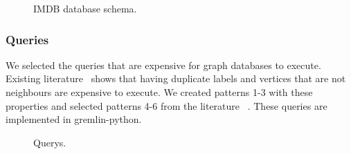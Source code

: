 \begin{figure}[t]
\centering
{}
\caption{IMDB database schema.}
\label{fig:schema}
\centering
\end{figure}

\subsubsection{Queries}

We selected the queries that are expensive for graph databases to execute. Existing literature~\cite{tripoulthere} shows that having duplicate labels and vertices that are not neighbours are expensive to execute. We created patterns 1-3 with these properties and selected patterns 4-6 from the literature ~\cite{tripoulthere}. These queries are implemented in gremlin-python. 

\begin{figure}[t]
\centering
{}
\caption{Querys.}
\label{fig:query}
\centering
\end{figure} 


